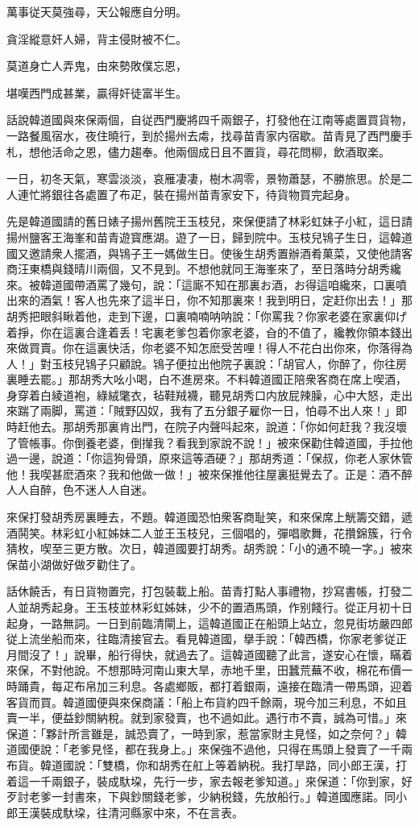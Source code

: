 萬事従天莫強尋，天公報應自分明。

貪淫縱意奸人婦，背主侵財被不仁。

莫道身亡人弄鬼，由來勢敗僕忘恩，

堪嘆西門成甚業，贏得奸徒富半生。

話說韓道國與來保兩個，自従西門慶將四千兩銀子，打發他在江南等處置買貨物，一路餐風宿水，夜住曉行，到於揚州去䖏，找尋苗青家内宿歇。苗青見了西門慶手札，想他活命之恩，儘力趨奉。他兩個成日且不置貨，尋花問柳，飲酒取楽。

一日，初冬天氣，寒雲淡淡，哀雁凄凄，樹木凋零，景物蕭瑟，不勝旅思。於是二人連忙將銀往各處置了布疋，裝在揚州苗青家安下，待貨物買完起身。

先是韓道國請的舊日婊子揚州舊院王玉枝兒，來保便請了林彩虹妹子小紅，這日請揚州鹽客王海峯和苗青遊寳應湖。遊了一日，歸到院中。玉枝兒鴇子生日，這韓道國又邀請衆人擺酒，與鴇子王一媽做生日。使後生胡秀置辦酒肴菓菜，又使他請客商汪東橋與錢晴川兩個，又不見到。不想他就同王海峯來了，至日落時分胡秀纔來。被韓道國帶酒罵了幾句，說：「這廝不知在那裏お酒，お得這咱纔來，口裏噴出來的酒氣！客人也先來了這半日，你不知那裏來！我到明日，定赶你出去！」那胡秀把眼斜瞅着他，走到下邊，口裏喃喃呐呐說：「你罵我？你家老婆在家裏仰げ着掙，你在這裏合逢着丢！宅裏老爹包着你家老婆，㒲的不值了，纔教你領本錢出來做買賣。你在這裏快活，你老婆不知怎麽受苦哩！得人不花白出你來，你落得為人！」對玉枝兒鴇子只顧說。鴇子便拉出他院子裏說：「胡官人，你醉了，你往房裏睡去罷。」那胡秀大吆小喝，白不進房來。不料韓道國正陪衆客商在席上喫酒，身穿着白綾道袍，綠絨氅衣，毡鞋羢襪，聽見胡秀口内放屁辣臊，心中大怒，走出來踹了兩脚，罵道：「賊野囚奴，我有了五分銀子雇你一日，怕尋不出人來！」即時赶他去。那胡秀那裏肯出門，在院子内聲呌起來，說道：「你如何赶我？我沒壞了管帳事。你倒養老婆，倒攆我？看我到家說不說！」被來保勸住韓道國，手拉他過一邊，說道：「你這狗骨頭，原來這等酒硬？」那胡秀道：「保叔，你老人家休管他！我喫甚麽酒來？我和他做一做！」被來保推他往屋裏挺覺去了。正是：酒不醉人人自醉，色不迷人人自迷。

來保打發胡秀房裏睡去，不題。韓道國恐怕衆客商耻笑，和來保席上觥籌交錯，遞酒鬨笑。林彩虹小紅姊妹二人並王玉枝兒，三個唱的，彈唱歌舞，花攢錦簇，行令猜枚，喫至三更方散。次日，韓道國要打胡秀。胡秀說：「小的通不曉一字。」被來保苗小湖做好做歹勸住了。

話休饒舌，有日貨物置完，打包裝載上船。苗青打點人事禮物，抄寫書帳，打發二人並胡秀起身。王玉枝並林彩虹姊妹，少不的置酒馬頭，作别餞行。從正月初十日起身，一路無詞。一日到前臨清閘上，這韓道國正在船頭上站立，忽見街坊嚴四郎従上流坐船而來，往臨清接官去。看見韓道國，擧手說：「韓西橋，你家老爹従正月間沒了！」說畢，船行得快，就過去了。這韓道國聽了此言，遂安心在懷，瞞着來保，不對他說。不想那時河南山東大旱，赤地千里，田蠶荒蕪不收，棉花布價一時踊貴，每疋布帛加三利息。各處鄉販，都打着銀兩，遠接在臨清一帶馬頭，迎着客貨而買。韓道國便與來保商議：「船上布貨約四千餘兩，現今加三利息，不如且賣一半，便益鈔關納稅。就到家發賣，也不過如此。遇行市不賣，誠為可惜。」來保道：「夥計所言雖是，誠恐賣了，一時到家，惹當家財主見怪，如之奈何？」韓道國便說：「老爹見怪，都在我身上。」來保強不過他，只得在馬頭上發賣了一千兩布貨。韓道國說：「雙橋，你和胡秀在舡上等着納税。我打旱路，同小郎王漢，打着這一千兩銀子，裝成馱垜，先行一步，家去報老爹知道。」來保道：「你到家，好歹討老爹一封書來，下與鈔關錢老爹，少納税錢，先放船行。」韓道國應諾。同小郎王漢裝成馱垜，往清河縣家中來，不在言表。


